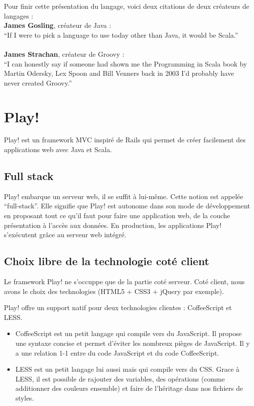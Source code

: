 Pour finir cette présentation du langage, voici deux citations de deux
créateurs de langages :\\
\textbf{James Gosling}, créateur de Java :\\
``If I were to pick a language to use today other than Java, it would be
Scala.''\\\\
\textbf{James Strachan}, créateur de Groovy :\\
``I can honestly say if someone had shown me the Programming in Scala
book by Martin Odersky, Lex Spoon and Bill Venners back in 2003 I’d probably
have never created Groovy.''\\




\section{Play!}

Play! est un framework MVC inspiré de Rails qui permet de créer facilement des
applications web avec Java et Scala.

\subsection{Full stack}
Play! embarque un serveur web, il se suffit à lui-même. Cette notion
est appelée “full-stack”. Elle signifie que Play! est autonome 
dans son mode de développement en proposant tout ce qu’il faut pour faire
une application web, de la couche présentation à l’accès aux données.
En production, les applications Play! s'exécutent grâce au serveur web intégré.

\subsection{Choix libre de la technologie coté client}

Le framework Play! ne s'occuppe que de la partie coté serveur.
Coté client, nous avons le choix des technologies (HTML5 + CSS3 + jQuery
par exemple).

Play! offre un support natif pour deux technologies clientes :
CoffeeScript et LESS.
\begin{itemize}
\item CoffeeScript est un petit langage qui compile vers du JavaScript.
  Il propose une syntaxe concise et permet d'éviter les nombreux pièges de
  JavaScript. Il y a une relation 1-1 entre du code JavaScript et du code
  CoffeeScript.
\item LESS est un petit langage lui aussi mais qui compile vers du CSS.
  Grace à LESS, il est possible de rajouter des variables, des opérations
  (comme additionner des couleurs ensemble) et faire de l'héritage dans nos
  fichiers de styles.
\end{itemize}

